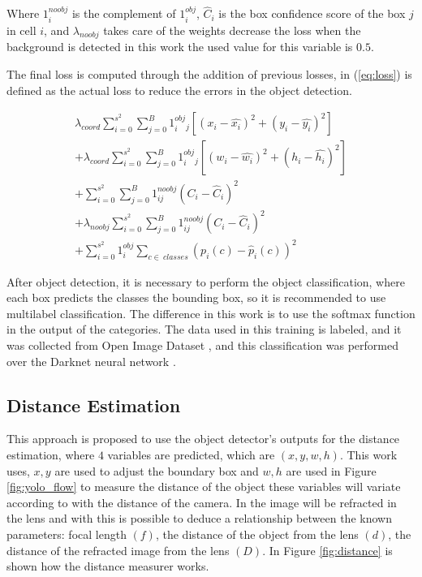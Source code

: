 Where $1^{noobj}_i$ is the complement of $1^{obj}_i$, $\hat{C}_i$ is the box confidence score of the box $j$ in cell $i$, and $\lambda_{noobj}$ takes care of the weights decrease the loss when the background is detected in this work the used value for this variable is $0.5$. 

The final loss is computed through the addition of previous losses, in (\ref{eq:loss}) is defined as the actual loss to reduce the errors in the object detection.

\begin{equation}
\label{eq:loss}
\begin{aligned}
    \lambda_{coord}\sum_{i=0}^{s^2}\sum_{j=0}^{B}1^{obj}_i_j\left [ \left ( x_i - \hat{x_i} \right )^2  + (y_i-\hat{y_i})^2 \right ] \\ 
    + \lambda_{coord}\sum_{i=0}^{s^2}\sum_{j=0}^{B}1^{obj}_i_j\left [ \left ( w_i - \hat{w_i} \right )^2  + (h_i-\hat{h_i})^2 \right ] \\
+    \sum_{i=0}^{s^2}\sum_{j=0}^{B}1^{noobj}_{ij}\left ( C_i - \hat{C}_i \right )^2\\
+  \lambda_{noobj}\sum_{i=0}^{s^2}\sum_{j=0}^{B}1^{noobj}_{ij}\left ( C_i - \hat{C}_i \right )^2\\
+     \sum_{i=0}^{s^2}1^{obj}_i \sum_{c\in~classes} \left ( p_i\left ( c \right )-\hat{p}_i\left ( c \right )\right )^2
    \end{aligned}
\end{equation}

After object detection, it is necessary to perform the object classification, where each box predicts the classes the bounding box, so it is recommended to use multilabel classification. The difference in this work is to use the softmax function in the output of the categories. The data used in this training is labeled, and it was collected from Open Image Dataset \cite{krasin2017openimages}, and this classification was performed over the Darknet neural network \cite{redmon2013darknet}.

\subsection{Distance Estimation}

This approach is proposed to use the object detector's outputs for the distance estimation, where $4$ variables are predicted, which are $(x, y, w, h)$. This work uses, $x,y$ are used to adjust the boundary box and $w, h$ are used in Figure \ref{fig:yolo_flow} to measure the distance of the object these variables will variate according to with the distance of the camera.  In \cite{cao2013circle} the image will be refracted in the lens and with this is possible to deduce a relationship between the known parameters: focal length $(f)$, the distance of the object from the lens $(d)$, the distance of the refracted image from the lens $(D)$. In Figure \ref{fig:distance} is shown how the distance measurer works. 


